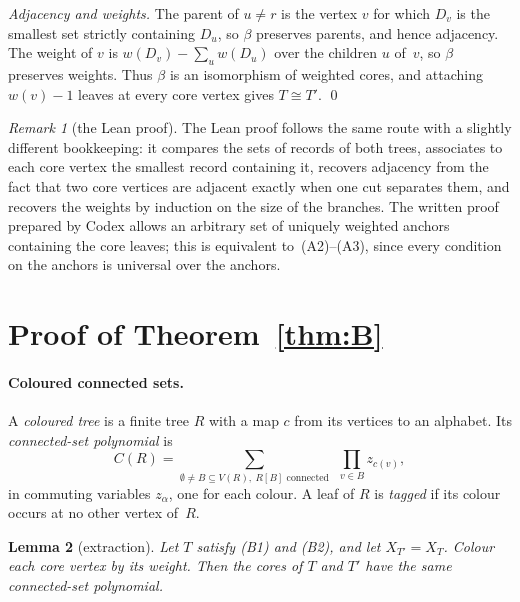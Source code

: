 \documentclass[11pt]{article}
\newtheorem{lemma}{Lemma}
\theoremstyle{definition}
\theoremstyle{remark}
\newtheorem{remark}[lemma]{Remark}
\begin{document}
\emph{Adjacency and weights.} The parent of $u\ne r$ is the vertex $v$ for which
$D_v$ is the smallest set strictly containing $D_u$, so $\beta$ preserves
parents, and hence adjacency. The weight of $v$ is
$w(D_v)-\sum_u w(D_u)$ over the children $u$ of~$v$, so $\beta$ preserves
weights. Thus $\beta$ is an isomorphism of weighted cores, and attaching $w(v)-1$
leaves at every core vertex gives $T\cong T'$. \qed

\begin{remark}[the Lean proof]\label{rem:leanA}
The Lean proof follows the same route with a slightly different bookkeeping:
it compares the sets of records of both trees, associates to each core vertex
the smallest record containing it, recovers adjacency from the fact that two
core vertices are adjacent exactly when one cut separates them, and recovers
the weights by induction on the size of the branches. The written proof prepared
by Codex allows an arbitrary set of uniquely weighted anchors containing the core
leaves; this is equivalent to~(A2)--(A3), since every condition on the anchors is
universal over the anchors.
\end{remark}

\section{Proof of Theorem~\ref{thm:B}}\label{sec:B}

\paragraph{Coloured connected sets.} A \emph{coloured tree} is a finite tree $R$
with a map $c$ from its vertices to an alphabet. Its \emph{connected-set
polynomial} is
\[
C(R)=\sum_{\emptyset\ne B\subseteq V(R),\ R[B]\text{ connected}}\ \ \prod_{v\in B}z_{c(v)},
\]
in commuting variables $z_\alpha$, one for each colour. A leaf of $R$ is
\emph{tagged} if its colour occurs at no other vertex of~$R$.

\begin{lemma}[extraction]\label{lem:extract}
Let $T$ satisfy (B1) and (B2), and let $X_{T'}=X_T$. Colour each core vertex by
its weight. Then the cores of $T$ and $T'$ have the same connected-set
polynomial.
\end{lemma}
\end{document}
